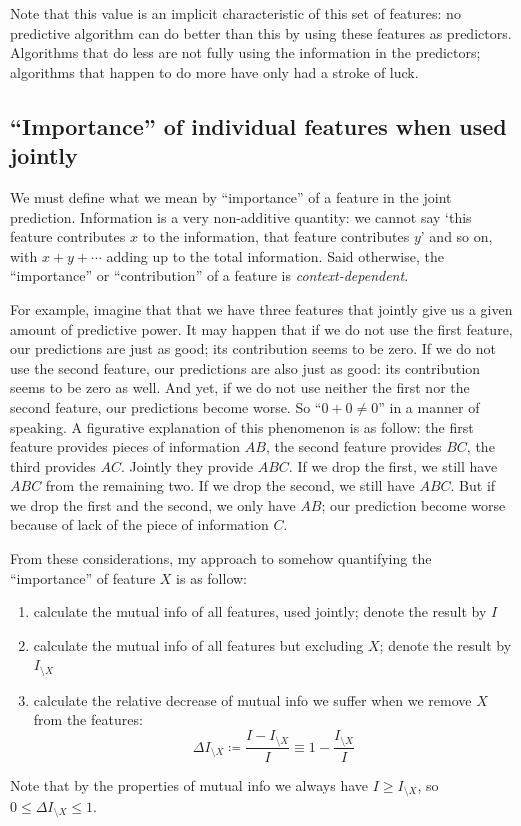\documentclass[\ifafour a4paper,12pt,\else a5paper,10pt,\fi%
onecolumn,oneside,article,%
british%
]{memoir}
\theoremstyle{remark}
\theoremstyle{innote}
\newcommand*{\defd}{\coloneqq}
\renewcommand*{\le}{\leqslant}%
\renewcommand*{\ge}{\geqslant}%
\renewcommand*{\|}[1][]{\nonscript\:#1\vert\nonscript\:\mathopen{}}
\newcommand*{\IX}{I_{\setminus X}}
\begin{document}
Note that this value is an implicit characteristic of this set of
features: no predictive algorithm can do better than this by using these
features as predictors. Algorithms that do less are not fully using the
information in the predictors; algorithms that happen to do more have only had a
stroke of luck.

\subsection{\enquote{Importance} of individual features when used jointly}
\label{sec:importance_features}

We must define what we mean by \enquote{importance} of a feature in the
joint prediction. Information is a very non-additive quantity: we cannot
say \enquote*{this feature contributes $x$ to the information, that feature
  contributes $y$} and so on, with $x+y+\dotsb$ adding up to the total
information. Said otherwise, the \enquote{importance} or
\enquote{contribution} of a feature is \emph{context-dependent}.

For example, imagine that that we have three features that jointly give us
a given amount of predictive power. It may happen that if we do not use the
first feature, our predictions are just as good; its contribution seems to
be zero. If we do not use the second feature, our predictions are also just
as good: its contribution seems to be zero as well. And yet, if we do not
use neither the first nor the second feature, our predictions become worse.
So \enquote{$0+0\ne 0$} in a manner of speaking. A figurative explanation
of this phenomenon is as follow: the first feature provides pieces of
information $AB$, the second feature provides $BC$, the third provides
$AC$. Jointly they provide $ABC$. If we drop the first, we still have $ABC$
from the remaining two. If we drop the second, we still have $ABC$. But if
we drop the first and the second, we only have $AB$; our prediction become
worse because of lack of the piece of information $C$.

\bigskip

From these considerations, my approach to somehow quantifying the
\enquote{importance} of feature $X$ is as follow:
\begin{enumerate}
\item calculate the mutual info of all features, used jointly; denote the
  result by $I$
\item calculate the mutual info of all features but excluding $X$; denote
  the result by $\IX$
\item calculate the relative decrease of mutual info we suffer when we
  remove $X$ from the features:
  \begin{equation}
    \label{eq:rel_decrease_MI_X}
    \Delta\IX \defd  \frac{I - \IX}{I}
    \equiv 1-\frac{\IX}{I}
  \end{equation}
\end{enumerate}
Note that by the properties of mutual info we always have $I \ge
\IX$, so $0 \le \Delta\IX \le 1$.
\end{document}
